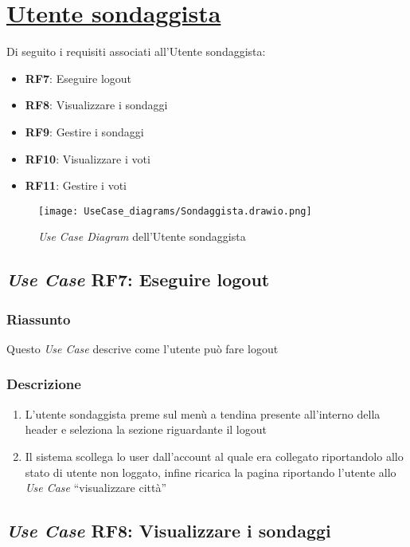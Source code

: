 \section{\texorpdfstring{\underline{Utente sondaggista}}{Utente sondaggista}}
    Di seguito i requisiti associati all'Utente sondaggista:
    \begin{itemize}
        \item \textbf{RF7}: Eseguire logout
        \item \textbf{RF8}: Visualizzare i sondaggi
        \item \textbf{RF9}: Gestire i sondaggi
        \item \textbf{RF10}: Visualizzare i voti
        \item \textbf{RF11}: Gestire i voti
    \end{itemize}
    \begin{figure}[H]
        \centering
        \texttt{[image: UseCase\_diagrams/Sondaggista.drawio.png]}
        \caption{\textit{Use Case Diagram} dell'Utente sondaggista}
    \end{figure}

    \subsection{\textit{Use Case} RF7: Eseguire logout}
        \subsubsection{Riassunto}
            Questo \textit{Use Case} descrive come l'utente può fare logout
        \subsubsection{Descrizione}
            \begin{enumerate}
                \item L'utente sondaggista preme sul menù a tendina presente all'interno della header e seleziona la sezione riguardante il logout
                \item Il sistema scollega lo user dall'account al quale era collegato riportandolo allo stato di utente non loggato, infine 
                ricarica la pagina riportando l'utente allo \textit{Use Case} ``visualizzare città''
            \end{enumerate}

    \subsection{\textit{Use Case} RF8: Visualizzare i sondaggi}
